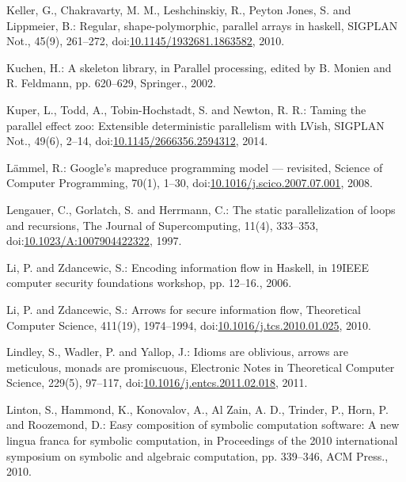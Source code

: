 \documentclass[paper=A4,twoside=true,openright,parskip=full,chapterprefix=true,headings=normal,bibliography=totoc,listof=totoc,titlepage=on,captions=tableabove,draft=false,british]{scrreprt}%
\begin{document}
\leavevmode\hypertarget{ref-Keller:2010:RSP:1932681.1863582}{}%
Keller, G., Chakravarty, M. M., Leshchinskiy, R., Peyton Jones, S. and
Lippmeier, B.: Regular, shape-polymorphic, parallel arrays in haskell,
SIGPLAN Not., 45(9), 261--272,
doi:\href{https://doi.org/10.1145/1932681.1863582}{10.1145/1932681.1863582},
2010.

\leavevmode\hypertarget{ref-Kuchen2002}{}%
Kuchen, H.: A skeleton library, in Parallel processing, edited by B.
Monien and R. Feldmann, pp. 620--629, Springer., 2002.

\leavevmode\hypertarget{ref-Kuper:2014:TPE:2666356.2594312}{}%
Kuper, L., Todd, A., Tobin-Hochstadt, S. and Newton, R. R.: Taming the
parallel effect zoo: Extensible deterministic parallelism with LVish,
SIGPLAN Not., 49(6), 2--14,
doi:\href{https://doi.org/10.1145/2666356.2594312}{10.1145/2666356.2594312},
2014.

\leavevmode\hypertarget{ref-LAMMEL20081}{}%
Lämmel, R.: Google's mapreduce programming model --- revisited, Science
of Computer Programming, 70(1), 1--30,
doi:\href{https://doi.org/10.1016/j.scico.2007.07.001}{10.1016/j.scico.2007.07.001},
2008.

\leavevmode\hypertarget{ref-Lengauer1997}{}%
Lengauer, C., Gorlatch, S. and Herrmann, C.: The static parallelization
of loops and recursions, The Journal of Supercomputing, 11(4), 333--353,\\
doi:\href{https://doi.org/10.1023/A:1007904422322}{10.1023/A:1007904422322},
1997.

\leavevmode\hypertarget{ref-1648705}{}%
Li, P. and Zdancewic, S.: Encoding information flow in Haskell, in
19IEEE computer security foundations workshop, pp. 12--16., 2006.

\leavevmode\hypertarget{ref-LI20101974}{}%
Li, P. and Zdancewic, S.: Arrows for secure information flow,
Theoretical Computer Science, 411(19), 1974--1994,
doi:\href{https://doi.org/10.1016/j.tcs.2010.01.025}{10.1016/j.tcs.2010.01.025},
2010.

\leavevmode\hypertarget{ref-LINDLEY201197}{}%
Lindley, S., Wadler, P. and Yallop, J.: Idioms are oblivious, arrows are
meticulous, monads are promiscuous, Electronic Notes in Theoretical
Computer Science, 229(5), 97--117,
doi:\href{https://doi.org/10.1016/j.entcs.2011.02.018}{10.1016/j.entcs.2011.02.018},
2011.

\leavevmode\hypertarget{ref-scscp}{}%
Linton, S., Hammond, K., Konovalov, A., Al Zain, A. D., Trinder, P.,
Horn, P. and Roozemond, D.: Easy composition of symbolic computation
software: A new lingua franca for symbolic computation, in Proceedings
of the 2010 international symposium on symbolic and algebraic
computation, pp. 339--346, ACM Press., 2010.
\end{document}
